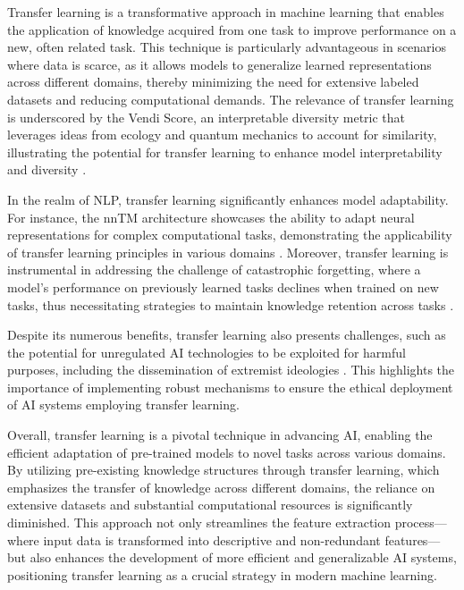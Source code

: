 Transfer learning is a transformative approach in machine learning that enables the application of knowledge acquired from one task to improve performance on a new, often related task. This technique is particularly advantageous in scenarios where data is scarce, as it allows models to generalize learned representations across different domains, thereby minimizing the need for extensive labeled datasets and reducing computational demands. The relevance of transfer learning is underscored by the Vendi Score, an interpretable diversity metric that leverages ideas from ecology and quantum mechanics to account for similarity, illustrating the potential for transfer learning to enhance model interpretability and diversity \cite{pasarkar2024cousinsvendiscorefamily}.



In the realm of NLP, transfer learning significantly enhances model adaptability. For instance, the nnTM architecture showcases the ability to adapt neural representations for complex computational tasks, demonstrating the applicability of transfer learning principles in various domains \cite{stogin2022provablystableneuralnetwork}. Moreover, transfer learning is instrumental in addressing the challenge of catastrophic forgetting, where a model's performance on previously learned tasks declines when trained on new tasks, thus necessitating strategies to maintain knowledge retention across tasks \cite{goldfarb2022analysiscatastrophicforgettingrandom}.



Despite its numerous benefits, transfer learning also presents challenges, such as the potential for unregulated AI technologies to be exploited for harmful purposes, including the dissemination of extremist ideologies \cite{mcguffie2020radicalizationrisksgpt3advanced}. This highlights the importance of implementing robust mechanisms to ensure the ethical deployment of AI systems employing transfer learning.



Overall, transfer learning is a pivotal technique in advancing AI, enabling the efficient adaptation of pre-trained models to novel tasks across various domains. By utilizing pre-existing knowledge structures through transfer learning, which emphasizes the transfer of knowledge across different domains, the reliance on extensive datasets and substantial computational resources is significantly diminished. This approach not only streamlines the feature extraction process—where input data is transformed into descriptive and non-redundant features—but also enhances the development of more efficient and generalizable AI systems, positioning transfer learning as a crucial strategy in modern machine learning. \cite{pihlgren2024systematicperformanceanalysisdeep,yuan2022secretgenprivacyrecoverypretrained}














